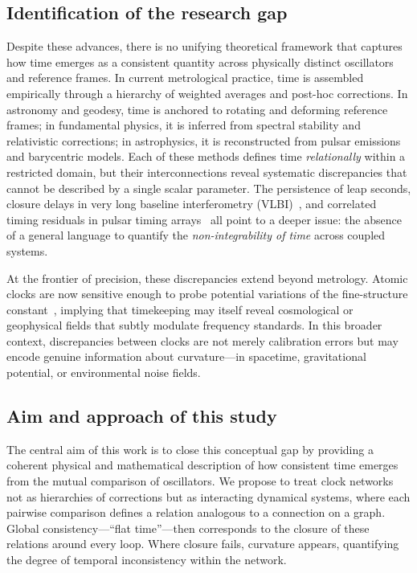 \documentclass[11pt,a4paper]{article}
\begin{document}
\subsection*{Identification of the research gap}

Despite these advances, there is no unifying theoretical framework that captures how time emerges as a consistent quantity across physically distinct oscillators and reference frames. 
In current metrological practice, time is assembled empirically through a hierarchy of weighted averages and post-hoc corrections. 
In astronomy and geodesy, time is anchored to rotating and deforming reference frames; in fundamental physics, it is inferred from spectral stability and relativistic corrections; in astrophysics, it is reconstructed from pulsar emissions and barycentric models. 
Each of these methods defines time \emph{relationally} within a restricted domain, but their interconnections reveal systematic discrepancies that cannot be described by a single scalar parameter. 
The persistence of leap seconds, closure delays in very long baseline interferometry (VLBI)~\citep{Thompson2017}, and correlated timing residuals in pulsar timing arrays~\citep{Detweiler1979,Hobbs2010,NANOGrav2023} all point to a deeper issue: the absence of a general language to quantify the \emph{non-integrability of time} across coupled systems.

At the frontier of precision, these discrepancies extend beyond metrology. 
Atomic clocks are now sensitive enough to probe potential variations of the fine-structure constant~\citep{Rosenband2008,Webb2011}, implying that timekeeping may itself reveal cosmological or geophysical fields that subtly modulate frequency standards. 
In this broader context, discrepancies between clocks are not merely calibration errors but may encode genuine information about curvature—in spacetime, gravitational potential, or environmental noise fields.

\subsection*{Aim and approach of this study}

The central aim of this work is to close this conceptual gap by providing a coherent physical and mathematical description of how consistent time emerges from the mutual comparison of oscillators. 
We propose to treat clock networks not as hierarchies of corrections but as interacting dynamical systems, where each pairwise comparison defines a relation analogous to a connection on a graph. 
Global consistency—``flat time''—then corresponds to the closure of these relations around every loop. 
Where closure fails, curvature appears, quantifying the degree of temporal inconsistency within the network. 
\end{document}

